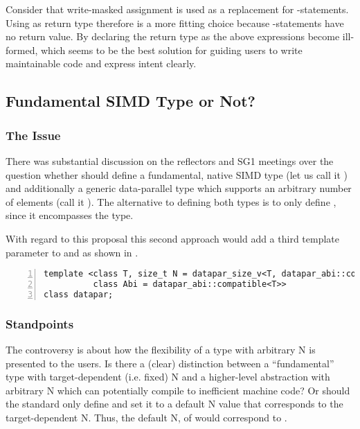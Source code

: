 Consider that write-masked assignment is used as a replacement for -statements.
Using \void as return type therefore is a more fitting choice because -statements have no return value.
By declaring the return type as \void the above expressions become ill-formed, which seems to be the best solution for guiding users to write maintainable code and express intent clearly.

\subsection{Fundamental SIMD Type or Not?}
\subsubsection{The Issue}
There was substantial discussion on the reflectors and SG1 meetings over the question whether \CC{} should define a fundamental, native SIMD type (let us call it ) and additionally a generic data-parallel type which supports an arbitrary number of elements (call it ).
The alternative to defining both types is to only define , since it encompasses the  type.

With regard to this proposal this second approach would add a third template parameter to \datapar and \mask as shown in .
\begin{lstlisting}[style=Vc,numbers=left,float,label=lst:datapar N,caption={
  Possible declaration of the class template parameters of a \datapar class with arbitrary width.
}]
template <class T, size_t N = datapar_size_v<T, datapar_abi::compatible<T>>,
          class Abi = datapar_abi::compatible<T>>
class datapar;
\end{lstlisting}

\subsubsection{Standpoints}
The controversy is about how the flexibility of a type with arbitrary \code N is presented to the users.
Is there a (clear) distinction between a “fundamental” type with target-dependent (i.e. fixed) \code N and a higher-level abstraction with arbitrary \code N which can potentially compile to inefficient machine code?
Or should the \CC{} standard only define  and set it to a default \code N value that corresponds to the target-dependent \code N.
Thus, the default \code N, of  would correspond to .

